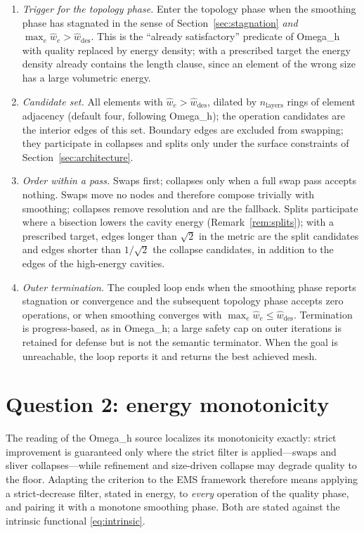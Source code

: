 \documentclass[11pt]{article}
\newcommand{\omegah}{Omega\_h}
\begin{document}
\begin{enumerate}[itemsep=2pt]
\item \emph{Trigger for the topology phase.} Enter the topology phase
  when the smoothing phase has stagnated in the sense of
  Section~\ref{sec:stagnation} \emph{and} $\max_e \hat{w}_e >
  \hat{w}_{\text{des}}$. This is the ``already satisfactory'' predicate
  of \omegah{} with quality replaced by energy density; with a
  prescribed target the energy density already contains the length
  clause, since an element of the wrong size has a large volumetric
  energy.
\item \emph{Candidate set.} All elements with $\hat{w}_e >
  \hat{w}_{\text{des}}$, dilated by $n_{\text{layers}}$ rings of element
  adjacency (default four, following \omegah{}); the operation
  candidates are the interior edges of this set. Boundary edges are
  excluded from swapping; they participate in collapses and splits only
  under the surface constraints of Section~\ref{sec:architecture}.
\item \emph{Order within a pass.} Swaps first; collapses only when a
  full swap pass accepts nothing. Swaps move no nodes and therefore
  compose trivially with smoothing; collapses remove resolution and are
  the fallback. Splits participate where a bisection lowers the cavity
  energy (Remark~\ref{rem:splits}); with a prescribed target, edges
  longer than $\sqrt2$ in the metric are the split candidates and edges
  shorter than $1/\sqrt2$ the collapse candidates, in addition to the
  edges of the high-energy cavities.
\item \emph{Outer termination.} The coupled loop ends when the smoothing
  phase reports stagnation or convergence and the subsequent topology
  phase accepts zero operations, or when smoothing converges with
  $\max_e \hat{w}_e \leq \hat{w}_{\text{des}}$. Termination is
  progress-based, as in \omegah{}; a large safety cap on outer
  iterations is retained for defense but is not the semantic
  terminator. When the goal is unreachable, the loop reports it and
  returns the best achieved mesh.
\end{enumerate}

\section{Question 2: energy monotonicity}
\label{sec:monotonicity}

The reading of the \omegah{} source localizes its monotonicity exactly:
strict improvement is guaranteed only where the strict filter is
applied---swaps and sliver collapses---while refinement and size-driven
collapse may degrade quality to the floor. Adapting the criterion to the
EMS framework therefore means applying a strict-decrease filter, stated
in energy, to \emph{every} operation of the quality phase, and pairing
it with a monotone smoothing phase. Both are stated against the
intrinsic functional \eqref{eq:intrinsic}.
\end{document}
